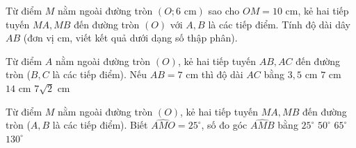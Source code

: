 \begin{bt}%
	Từ điểm $M$ nằm ngoài đường tròn $(O; 6\text{ cm})$ sao cho $OM = 10\text{ cm}$, kẻ hai tiếp tuyến $MA, MB$ đến đường tròn $(O)$ với $A, B$ là các tiếp điểm. Tính độ dài dây $AB$ (đơn vị cm, viết kết quả dưới dạng số thập phân).
\end{bt}

\begin{ex}%
	Từ điểm $A$ nằm ngoài đường tròn $(O)$, kẻ hai tiếp tuyến $AB, AC$ đến đường tròn ($B, C$ là các tiếp điểm). Nếu $AB = 7\text{ cm}$ thì độ dài $AC$ bằng
	\choice
	{$3{,}5\text{ cm}$}
	{\True $7\text{ cm}$}
	{$14\text{ cm}$}
	{$7\sqrt{2}\text{ cm}$}
\end{ex}

\begin{ex}%
	Từ điểm $M$ nằm ngoài đường tròn $(O)$, kẻ hai tiếp tuyến $MA, MB$ đến đường tròn ($A, B$ là các tiếp điểm). Biết $\widehat{AMO} = 25^\circ$, số đo góc $\widehat{AMB}$ bằng
	\choice
	{$25^\circ$}
	{\True $50^\circ$}
	{$65^\circ$}
	{$130^\circ$}
\end{ex}

